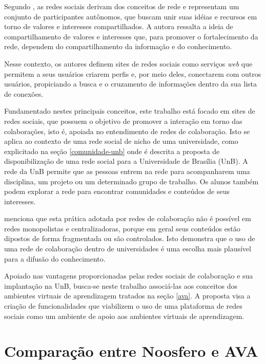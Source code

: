 Segundo \cite{marteleto2001analise}, as redes sociais derivam dos conceitos de rede e representam um conjunto de participantes autônomos, que buscam unir suas idéias e recursos em torno de valores e interesses compartilhados. A autora ressalta a ideia de compartilhamento de valores e interesses que, para promover o fortalecimento da rede, dependem do compartilhamento da informação e do conhecimento.

Nesse contexto, os autores  definem sites de redes sociais como serviços \textit{web} que permitem a seus usuários criarem perfis e, por meio deles, conectarem com outros usuários, propiciando a busca e o cruzamento de informações dentro da sua lista de conexões.

Fundamentado nestes principais conceitos, este trabalho está focado em sites de redes sociais, que possuem o objetivo de promover a interação em torno das colaborações, isto é, apoiada no entendimento de redes de colaboração. Isto se aplica ao contexto de uma rede social de nicho de uma universidade, como explicitado na seção \ref{comunidade-unb} onde é descrita a proposta de disponibilização de uma rede social para a Universidade de Brasília (UnB). A rede da UnB permite que as pessoas entrem na rede para acompanharem uma disciplina, um projeto ou um determinado grupo de trabalho. Os alunos também podem explorar a rede para encontrar comunidades e conteúdos de seus interesses.

 menciona que esta prática adotada por redes de colaboração não é possível em redes monopolistas e centralizadoras, porque em geral seus conteúdos estão dipostos de forma fragmentada ou são controlados. Isto demonstra que o uso de uma rede de colaboração dentro de universidades é uma escolha mais plausível para a difusão do conhecimento.

Apoiado nas vantagens proporcionadas pelas redes sociais de colaboração e sua implantação na UnB, busca-se neste trabalho associá-las aos conceitos dos ambientes virtuais de aprendizagem tratados na seção \ref{ava}. A proposta visa a criação de funcionalidades que viabilizem o uso de uma plataforma de redes sociais como um ambiente de apoio aos ambientes virtuais de aprendizagem.

\section{Comparação entre Noosfero e AVA}
\label{comparacao-ava}

